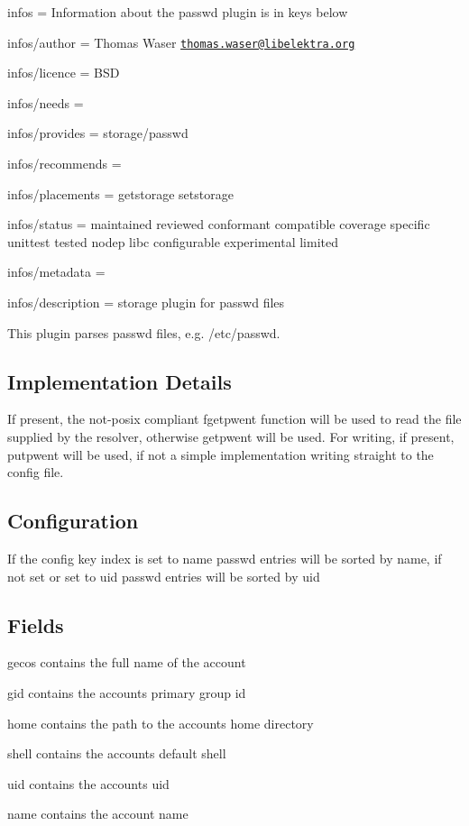 
\begin{DoxyItemize}
\item infos = Information about the passwd plugin is in keys below
\item infos/author = Thomas Waser \href{mailto:thomas.waser@libelektra.org}{\tt thomas.\+waser@libelektra.\+org}
\item infos/licence = B\+SD
\item infos/needs =
\item infos/provides = storage/passwd
\item infos/recommends =
\item infos/placements = getstorage setstorage
\item infos/status = maintained reviewed conformant compatible coverage specific unittest tested nodep libc configurable experimental limited
\item infos/metadata =
\item infos/description = storage plugin for passwd files
\end{DoxyItemize}

This plugin parses {\ttfamily passwd} files, e.\+g. {\ttfamily /etc/passwd}.

\subsection*{Implementation Details}

If present, the not-\/posix compliant {\ttfamily fgetpwent} function will be used to read the file supplied by the resolver, otherwise {\ttfamily getpwent} will be used. For writing, if present, {\ttfamily putpwent} will be used, if not a simple implementation writing straight to the config file.

\subsection*{Configuration}

If the config key {\ttfamily index} is set to {\ttfamily name} passwd entries will be sorted by name, if not set or set to {\ttfamily uid} passwd entries will be sorted by uid

\subsection*{Fields}


\begin{DoxyItemize}
\item {\ttfamily gecos} contains the full name of the account
\item {\ttfamily gid} contains the accounts primary group id
\item {\ttfamily home} contains the path to the accounts home directory
\item {\ttfamily shell} contains the accounts default shell
\item {\ttfamily uid} contains the accounts uid
\item {\ttfamily name} contains the account name
\end{DoxyItemize}


